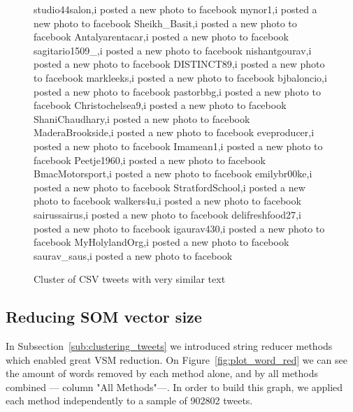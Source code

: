 \begin{figure}[htpb]
  \centering
    \begin{boxedverbatim}                   
    studio44salon,i posted a new photo to facebook
    mynor1,i posted a new photo to facebook
    Sheikh_Basit,i posted a new photo to facebook
    Antalyarentacar,i posted a new photo to facebook
    sagitario1509_,i posted a new photo to facebook
    nishantgourav,i posted a new photo to facebook
    DISTINCT89,i posted a new photo to facebook
    markleeks,i posted a new photo to facebook
    bjbaloncio,i posted a new photo to facebook
    pastorbbg,i posted a new photo to facebook
    Christochelsea9,i posted a new photo to facebook
    ShaniChaudhary,i posted a new photo to facebook
    MaderaBrookside,i posted a new photo to facebook
    eveproducer,i posted a new photo to facebook
    Imamean1,i posted a new photo to facebook
    Peetje1960,i posted a new photo to facebook
    BmacMotorsport,i posted a new photo to facebook
    emilybr00ke,i posted a new photo to facebook
    StratfordSchool,i posted a new photo to facebook
    walkers4u,i posted a new photo to facebook
    sairussairus,i posted a new photo to facebook
    delifreshfood27,i posted a new photo to facebook
    igaurav430,i posted a new photo to facebook
    MyHolylandOrg,i posted a new photo to facebook
    saurav_saus,i posted a new photo to facebook
   
    \end{boxedverbatim}
    \caption{Cluster of \ac{CSV} tweets with very similar text}
    \label{fig:cluster3}
\end{figure}

\subsection{Reducing SOM vector size}
\label{sub:reducing_som_vector_size}
In Subsection~\ref{sub:clustering_tweets} we introduced string reducer methods which enabled great \ac{VSM} reduction. On Figure~\ref{fig:plot_word_red} we can see the amount of words removed by each method alone, and by all methods combined --- column "All Methods"---. In order to build this graph, we applied each method independently to a sample of 902802 tweets.

